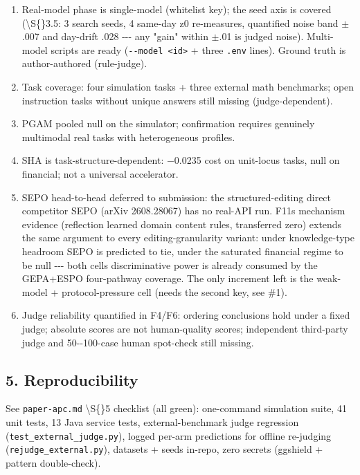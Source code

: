 \begin{enumerate}
\def\labelenumi{\arabic{enumi}.}
\tightlist
\item
  Real-model phase is single-model (whitelist key); the seed axis is covered (\textbackslash S\{\}3.5: 3 search seeds, 4 same-day z0 re-measures, quantified noise band \(\pm\).007 and day-drift .028 -\/-\/- any "gain" within \(\pm\).01 is judged noise). Multi-model scripts are ready (\texttt{-\/-model\ \textless{}id\textgreater{}} + three \texttt{.env} lines). Ground truth is author-authored (rule-judge).
\item
  Task coverage: four simulation tasks + three external math benchmarks; open instruction tasks without unique answers still missing (judge-dependent).
\item
  PGAM pooled null on the simulator; confirmation requires genuinely multimodal real tasks with heterogeneous profiles.
\item
  SHA is task-structure-dependent: \(-\)0.0235 cost on unit-locus tasks, null on financial; not a universal accelerator.
\item
  SEPO head-to-head deferred to submission: the structured-editing direct competitor SEPO (arXiv 2608.28067) has no real-API run. F11\textquotesingle s mechanism evidence (reflection learned domain content rules, transferred zero) extends the same argument to every editing-granularity variant: under knowledge-type headroom SEPO is predicted to tie, under the saturated financial regime to be null -\/-\/- both cells\textquotesingle{} discriminative power is already consumed by the GEPA+ESPO four-pathway coverage. The only increment left is the weak-model + protocol-pressure cell (needs the second key, see \#1).
\item
  Judge reliability quantified in F4/F6: ordering conclusions hold under a fixed judge; absolute scores are not human-quality scores; independent third-party judge and 50-\/-100-case human spot-check still missing.
\end{enumerate}

\subsection{5. Reproducibility}\label{5-reproducibility}

See \texttt{paper-apc.md} \textbackslash S\{\}5 checklist (all green): one-command simulation suite, 41 unit tests, 13 Java service tests, external-benchmark judge regression (\texttt{test\_external\_judge.py}), logged per-arm predictions for offline re-judging (\texttt{rejudge\_external.py}), datasets + seeds in-repo, zero secrets (ggshield + pattern double-check).

